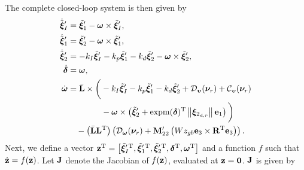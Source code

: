 The complete closed-loop system is then given by
\begin{subequations}
    \begin{align}
        \dot{\tilde{\bm{\xi}}}_I^{\prime} &= \tilde{\bm{\xi}}_1^{\prime} - \bm{\omega} \times \tilde{\bm{\xi}}_I^{\prime}, \\
        \dot{\tilde{\bm{\xi}}}_1^{\prime} &= \tilde{\bm{\xi}}_2^{\prime} - \bm{\omega} \times \tilde{\bm{\xi}}_1^{\prime}, \\
        \dot{\tilde{\bm{\xi}}}_2^{\prime} &= -k_I \tilde{\bm{\xi}}_I^{\prime} - k_p \tilde{\bm{\xi}}_1^{\prime} - k_d \tilde{\bm{\xi}}_2^{\prime} - \bm{\omega} \times \tilde{\bm{\xi}}_2^{\prime}, \\
        \dot{\bm{\delta}} &= \bm{\omega}, \\
        \dot{\bm{\omega}} &= \Bar{\mathbf{L}} \times \bigg(-k_I \tilde{\bm{\xi}}_I^{\prime} - k_p \tilde{\bm{\xi}}_1^{\prime} - k_d \tilde{\bm{\xi}}_2^{\prime} + \mathcal{D}_{\bm{\upsilon}}(\bm{\nu}_r) + \mathcal{C}_{\bm{\upsilon}}(\bm{\nu}_r) \nonumber \\
        &\qquad \qquad - \bm{\omega} \times \left(\tilde{\bm{\xi}}_2^{\prime} + {\rm expm}(\bm{\delta})^{\mathrm{T}} \left\|\bm{\xi}_{2_{d,r}}\right\|\mathbf{e}_1\right)\bigg) \nonumber \\
        &\quad - \left(\Bar{\mathbf{L}}\mathbf{L}^{\mathrm{T}}\right) \left(\mathcal{D}_{\bm{\omega}}(\bm{\nu}_r) + \mathbf{M}_{22}^{\prime}\left(Wz_{gb} \mathbf{e}_3 \times \mathbf{R}^{\mathrm{T}} \mathbf{e}_3\right)\right).
    \end{align}
\end{subequations}
Next, we define a vector $\mathbf{z}^{\mathrm{T}} = \left[{\tilde{\bm{\xi}}_I^{\prime\,{\rm T}}}, {\tilde{\bm{\xi}}_1^{\prime\,{\rm T}}}, {\tilde{\bm{\xi}}_2^{\prime\,{\rm T}}}, \bm{\delta}^{\mathrm{T}}, \bm{\omega}^{\mathrm{T}}\right]$ and a function $f$ such that $\dot{\mathbf{z}} = f(\mathbf{z})$.
Let $\mathbf{J}$ denote the Jacobian of $f(\mathbf{z})$, evaluated at $\mathbf{z} = \mathbf{0}$.
$\mathbf{J}$ is given by

